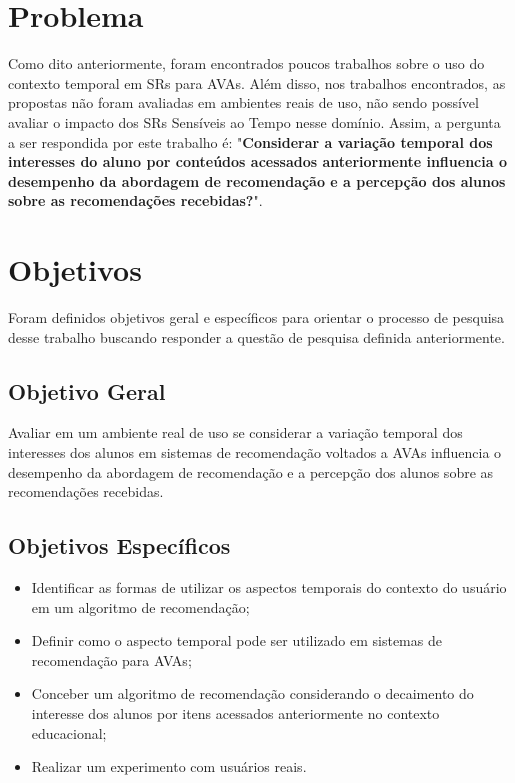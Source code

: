 \section{Problema}

Como dito anteriormente, foram encontrados poucos trabalhos sobre o uso do contexto temporal em SRs para AVAs. Além disso,
nos trabalhos encontrados, as propostas não foram avaliadas em ambientes reais de uso, não sendo possível avaliar o
impacto dos SRs Sensíveis ao Tempo nesse domínio. Assim, a pergunta a ser respondida por este trabalho
é: "\textbf{Considerar a variação temporal dos interesses do aluno por conteúdos acessados anteriormente influencia o desempenho
da abordagem de recomendação e a percepção dos alunos sobre as recomendações recebidas?}".

\section{Objetivos}

Foram definidos objetivos geral e específicos para orientar o processo de pesquisa desse trabalho buscando responder a questão
de pesquisa definida anteriormente.

\subsection{Objetivo Geral}

Avaliar em um ambiente real de uso se considerar a variação temporal dos interesses dos alunos em sistemas de recomendação
voltados a AVAs influencia o desempenho da abordagem de recomendação e a percepção dos alunos sobre as recomendações recebidas.

\subsection{Objetivos Específicos}

\begin{itemize}
\item Identificar as formas de utilizar os aspectos temporais do contexto do usuário em um algoritmo de recomendação;
\item Definir como o aspecto temporal pode ser utilizado em sistemas de recomendação para AVAs;
\item Conceber um algoritmo de recomendação considerando o decaimento do interesse dos alunos por itens acessados
anteriormente no contexto educacional;
\item Realizar um experimento com usuários reais.
\end{itemize}


